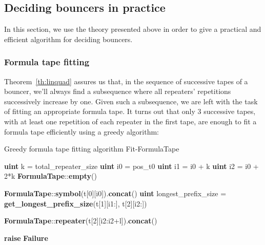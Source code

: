 \subsection{Deciding bouncers in practice}

In this section, we use the theory presented above in order to give a practical and efficient algorithm for deciding bouncers.

\subsubsection{Formula tape fitting}

Theorem~\ref{th:linquad} assures us that, in the sequence of successive tapes of a bouncer, we'll always find a subsequence where all repeaters' repetitions successively increase by one. Given such a subsequence, we are left with the task of fitting an appropriate formula tape. It turns out that only 3 successive tapes, with at least one repetition of each repeater in the first tape, are enough to fit a formula tape efficiently using a greedy algorithm:

\begin{algorithm}
    \caption{Greedy formula tape fitting algorithm {\sc Fit-FormulaTape}}\label{alg:greedy-formula-tape-fitting}
    \begin{algorithmic}[1]


        \State \textbf{uint} k = total\_repeater\_size
        \State \textbf{uint} i0 = pos\_t0
        \State \textbf{uint} i1 = i0 + k
        \State \textbf{uint} i2 = i0 + 2*k
        \State
        \State \Return \textbf{FormulaTape}::\textbf{empty}()

        \EndIf
        \State
        \State \Return \textbf{FormulaTape}::\textbf{symbol}(t[0][i0]).\textbf{concat}()
        \EndIf
        \State
        \State
        \textbf{uint} longest\_prefix\_size = \textbf{get\_longest\_prefix\_size}(t[1][i1:], t[2][i2:])
        \State

        \State \Return \textbf{FormulaTape}::\textbf{repeater}(t[2][i2:i2+l]).\textbf{concat}()
        \EndIf

        \EndFor
        \State
        \State \textbf{raise} \textbf{Failure}
        \EndProcedure
    \end{algorithmic}
\end{algorithm}

